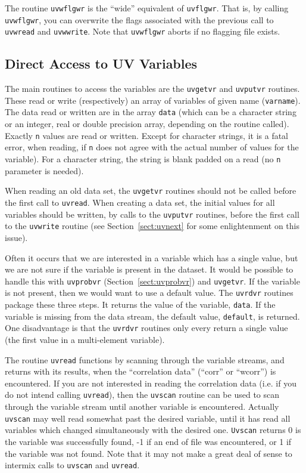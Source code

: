 The routine {\tt uvwflgwr} is the ``wide'' equivalent of {\tt uvflgwr}.
That is, by calling {\tt uvwflgwr}, you can overwrite the flags associated
with the previous call to 
{\tt uvwread} and {\tt uvwwrite}. Note that {\tt uvwflgwr} aborts if no
flagging file exists.

\subsection{Direct Access to UV Variables}
The main routines to access the variables are the {\tt uvgetvr} and
{\tt uvputvr} routines. These read or write (respectively) an array of
variables of given name ({\tt varname}). The data read or written are
in the array {\tt data} (which can be a character string or an integer, real
or double precision
array, depending on the routine called). Exactly {\tt n} values are
read or written. Except for character strings, it is a fatal error,
when reading, if {\tt n} does not
agree with the actual number of values for the variable). For a character
string, the string is blank padded on a read (no {\tt n} parameter is
needed).

When reading an old data set, the {\tt uvgetvr} routines should not be called
before the first call to {\tt uvread}.
When creating a data set, the initial values for all variables should be
written, by calls to the {\tt uvputvr} routines, before the first call
to the {\tt uvwrite} routine (see Section~\ref{sect:uvnext} for
some enlightenment on this issue).

Often it occurs that we are interested in a variable which has a single
value, but we are not sure if the variable is present in the dataset.
It would be possible to handle this with {\tt uvprobvr}
(Section~\ref{sect:uvprobvr}) and {\tt uvgetvr}.
If the variable is not present, then we would want to use a default value.
The {\tt uvrdvr} routines package these three steps. It returns the
value of the variable, {\tt data}. If the variable is missing from the
data stream, the default value, {\tt default}, is returned. One disadvantage
is that the {\tt uvrdvr} routines only every return a single value (the first
value in a multi-element variable).

The routine {\tt uvread} functions by scanning through the variable streams,
and returns with its results, when the ``correlation data'' (``corr'' or
``wcorr'')
is encountered. If you are not interested in reading the correlation data
(i.e. if you do not intend calling {\tt uvread}),
then the {\tt uvscan} routine can be used to scan through the variable stream
until another variable is encountered. Actually {\tt uvscan} may well read
somewhat past the desired variable, until it has read
all variables which changed simultaneously with the desired one.
{\tt Uvscan} returns 0 is the variable was
successfully found, -1 if an end of file was encountered, or 1 if the
variable was not found. Note that it may not make a great
deal of sense to intermix calls to {\tt uvscan} and {\tt uvread}.

